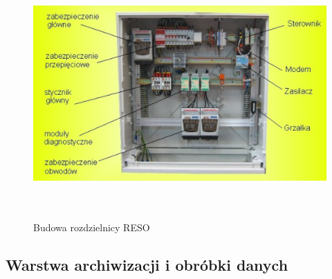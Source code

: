 \begin{figure}[t]
	\includegraphics[height=95mm]{./img/dimacek_rozdzielnica.png}
	\caption{Budowa rozdzielnicy RESO}
	\label{fig:dimacek-reso}
\end{figure}

\subsection{Warstwa archiwizacji i obróbki danych}